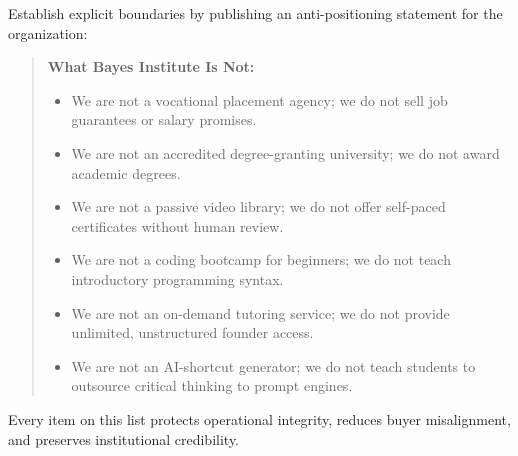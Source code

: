 Establish explicit boundaries by publishing an anti-positioning statement for the organization:
\begin{quote}
\textbf{What Bayes Institute Is Not:}
\begin{itemize}
    \item We are not a vocational placement agency; we do not sell job guarantees or salary promises.
    \item We are not an accredited degree-granting university; we do not award academic degrees.
    \item We are not a passive video library; we do not offer self-paced certificates without human review.
    \item We are not a coding bootcamp for beginners; we do not teach introductory programming syntax.
    \item We are not an on-demand tutoring service; we do not provide unlimited, unstructured founder access.
    \item We are not an AI-shortcut generator; we do not teach students to outsource critical thinking to prompt engines.
\end{itemize}
\end{quote}

Every item on this list protects operational integrity, reduces buyer misalignment, and preserves institutional credibility.
